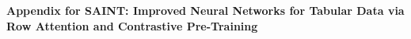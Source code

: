 












% 

\appendix
\textbf{\Large{Appendix for SAINT: Improved Neural Networks for Tabular Data via Row Attention and Contrastive Pre-Training}}

